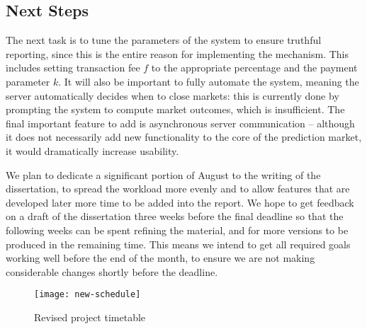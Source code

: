 \subsection{Next Steps}


The next task is to tune the parameters of the system to ensure truthful
reporting, since this is the entire reason for implementing the mechanism. This
includes setting transaction fee $f$ to the appropriate percentage and the
payment parameter $k$. It will also be important to fully automate the system,
meaning the server automatically decides when to close markets: this is
currently done by prompting the system to compute market outcomes, which is
insufficient. The final important feature to add is asynchronous server
communication -- although it does not necessarily add new functionality to the
core of the prediction market, it would dramatically increase usability. 

We plan to dedicate a significant portion of August to the writing of the
dissertation, to spread the workload more evenly and to allow features that are
developed later more time to be added into the report.  We hope to get feedback
on a draft of the dissertation three weeks before the final deadline so that
the following weeks can be spent refining the material, and for more versions
to be produced in the remaining time. This means we intend to get all required
goals working well before the end of the month, to ensure we are not making
considerable changes shortly before the deadline.

\begin{figure}[h]
	\centering
	\texttt{[image: new-schedule]}
	\caption{Revised project timetable}
	\label{fig:new-schedule}
\end{figure}


